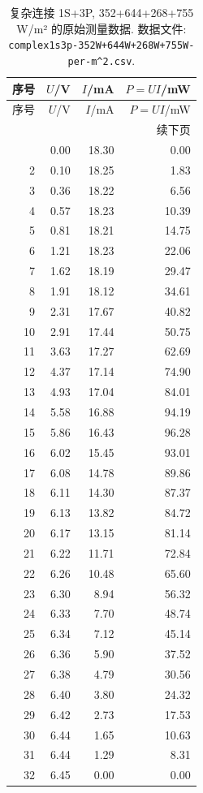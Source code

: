 \documentclass[UTF8,a4paper,11pt]{ctexart}
\begin{document}
\begin{longtable}{rrrr}
\caption{复杂连接 1S+3P, 352+644+268+755 W/m² 的原始测量数据. 数据文件: \texttt{complex1s3p-352W+644W+268W+755W-per-m\textasciicircum{}2.csv}.}\\
\toprule
序号 & $U$/V & $I$/mA & $P=UI$/mW \\
\midrule
\endfirsthead
\toprule
序号 & $U$/V & $I$/mA & $P=UI$/mW \\
\midrule
\endhead
\midrule
\multicolumn{4}{r}{续下页} \\
\endfoot
\bottomrule
\endlastfoot
1 & 0.00 & 18.30 & 0.00 \\
2 & 0.10 & 18.25 & 1.83 \\
3 & 0.36 & 18.22 & 6.56 \\
4 & 0.57 & 18.23 & 10.39 \\
5 & 0.81 & 18.21 & 14.75 \\
6 & 1.21 & 18.23 & 22.06 \\
7 & 1.62 & 18.19 & 29.47 \\
8 & 1.91 & 18.12 & 34.61 \\
9 & 2.31 & 17.67 & 40.82 \\
10 & 2.91 & 17.44 & 50.75 \\
11 & 3.63 & 17.27 & 62.69 \\
12 & 4.37 & 17.14 & 74.90 \\
13 & 4.93 & 17.04 & 84.01 \\
14 & 5.58 & 16.88 & 94.19 \\
15 & 5.86 & 16.43 & 96.28 \\
16 & 6.02 & 15.45 & 93.01 \\
17 & 6.08 & 14.78 & 89.86 \\
18 & 6.11 & 14.30 & 87.37 \\
19 & 6.13 & 13.82 & 84.72 \\
20 & 6.17 & 13.15 & 81.14 \\
21 & 6.22 & 11.71 & 72.84 \\
22 & 6.26 & 10.48 & 65.60 \\
23 & 6.30 & 8.94 & 56.32 \\
24 & 6.33 & 7.70 & 48.74 \\
25 & 6.34 & 7.12 & 45.14 \\
26 & 6.36 & 5.90 & 37.52 \\
27 & 6.38 & 4.79 & 30.56 \\
28 & 6.40 & 3.80 & 24.32 \\
29 & 6.42 & 2.73 & 17.53 \\
30 & 6.44 & 1.65 & 10.63 \\
31 & 6.44 & 1.29 & 8.31 \\
32 & 6.45 & 0.00 & 0.00 \\
\end{longtable}
\newpage
\end{document}
